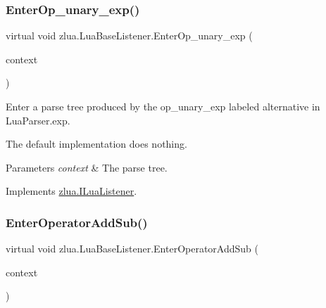 \subsubsection{\texorpdfstring{Enter\+Op\+\_\+unary\+\_\+exp()}{EnterOp\_unary\_exp()}}
{\footnotesize\ttfamily virtual void zlua.\+Lua\+Base\+Listener.\+Enter\+Op\+\_\+unary\+\_\+exp (\begin{DoxyParamCaption}\item[{\mbox{[}\+Not\+Null\mbox{]} \mbox{\hyperlink{classzlua_1_1_lua_parser_1_1_op__unary__exp_context}{Lua\+Parser.\+Op\+\_\+unary\+\_\+exp\+Context}}}]{context }\end{DoxyParamCaption})\hspace{0.3cm}{\ttfamily [virtual]}}



Enter a parse tree produced by the {\ttfamily op\+\_\+unary\+\_\+exp} labeled alternative in Lua\+Parser.\+exp. 

The default implementation does nothing.


\begin{DoxyParams}{Parameters}
{\em context} & The parse tree.\\
\hline
\end{DoxyParams}


Implements \mbox{\hyperlink{interfacezlua_1_1_i_lua_listener_ab264dde9b798933c740a470090b2db94}{zlua.\+I\+Lua\+Listener}}.

\mbox{\label{classzlua_1_1_lua_base_listener_ac3bb5e4809651278e44d46bc5ca3c7b1}} 
\subsubsection{\texorpdfstring{Enter\+Operator\+Add\+Sub()}{EnterOperatorAddSub()}}
{\footnotesize\ttfamily virtual void zlua.\+Lua\+Base\+Listener.\+Enter\+Operator\+Add\+Sub (\begin{DoxyParamCaption}\item[{\mbox{[}\+Not\+Null\mbox{]} \mbox{\hyperlink{classzlua_1_1_lua_parser_1_1_operator_add_sub_context}{Lua\+Parser.\+Operator\+Add\+Sub\+Context}}}]{context }\end{DoxyParamCaption})\hspace{0.3cm}{\ttfamily [virtual]}}



